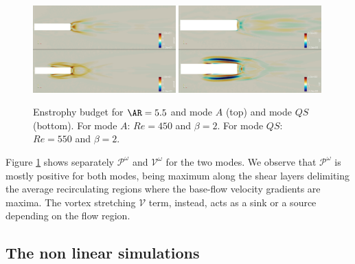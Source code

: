 \begin{figure}
  \centering
  \includegraphics[width=0.49\textwidth]{./fig/AR5p5/Prod_Re450_Re550_beta2_enst.png}
  \includegraphics[width=0.49\textwidth]{./fig/AR5p5/Vst_Re450_Re550_beta2_enst.png}
  \caption{Enstrophy budget for $\AR=5.5$ and mode $A$ (top) and mode $QS$ (bottom). For mode $A$: $Re=450$ and $\beta=2$. For mode $QS$: $Re=550$ and $\beta=2$.}
  \label{fig:enst_budget}
\end{figure}

Figure \ref{fig:enst_budget} shows separately $\mathcal{P}^\omega$ and $\mathcal{V}^\omega$ for the two modes. We observe that $\mathcal{P}^\omega$ is mostly positive for both modes, being maximum along the shear layers delimiting the average recirculating regions where the base-flow velocity gradients are maxima. The vortex stretching $\mathcal{V}$ term, instead, acts as a sink or a source depending on the flow region.
\fi

\subsection{The non linear simulations}

